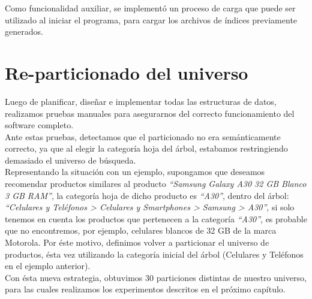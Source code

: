 Como funcionalidad auxiliar, se implement\'o un proceso de carga que puede ser utilizado al iniciar el programa, para cargar los archivos de \'indices previamente generados.


\section{Re-particionado del universo}

Luego de planificar, diseñar e implementar todas las estructuras de datos, realizamos pruebas manuales para asegurarnos del correcto funcionamiento del software completo.\\

Ante estas pruebas, detectamos que el particionado no era sem\'anticamente correcto, ya que al elegir la categor\'ia hoja del \'arbol, estabamos restringiendo demasiado el universo de b\'usqueda.\\

Representando la situaci\'on con un ejemplo, supongamos que deseamos recomendar productos similares al producto \textit{“Samsung Galaxy A30 32 GB Blanco 3 GB RAM”}, la categor\'ia hoja de dicho producto es \textit{“A30”}, dentro del \'arbol: \textit{“Celulares y Tel\'efonos > Celulares y Smartphones > Samsung > A30”}, si solo tenemos en cuenta los productos que pertenecen a la categor\'ia \textit{“A30”}, es probable que no encontremos, por ejemplo, celulares blancos de 32 GB de la marca Motorola.
Por \'este motivo, definimos volver a particionar el universo de productos, \'esta vez utilizando la categor\'ia inicial del \'arbol (Celulares y Tel\'efonos en el ejemplo anterior).\\

Con \'esta nueva estrategia, obtuvimos 30 particiones distintas de nuestro universo, para las cuales realizamos los experimentos descritos en el pr\'oximo cap\'itulo.
